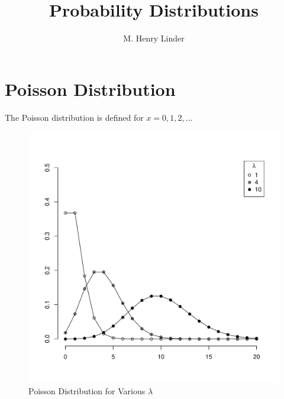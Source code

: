 \documentclass{tufte-handout}
\title{Probability Distributions}
\author{M. Henry Linder}
\date{}
\begin{document}
\maketitle

\section{Poisson Distribution}
The Poisson distribution is defined for $x = 0, 1, 2, \dots$

\begin{figure}
    \includegraphics[width=\textwidth]{poisson_bw.pdf}
    \caption{Poisson Distribution for Various $\lambda$}
\end{figure}
\end{document}
